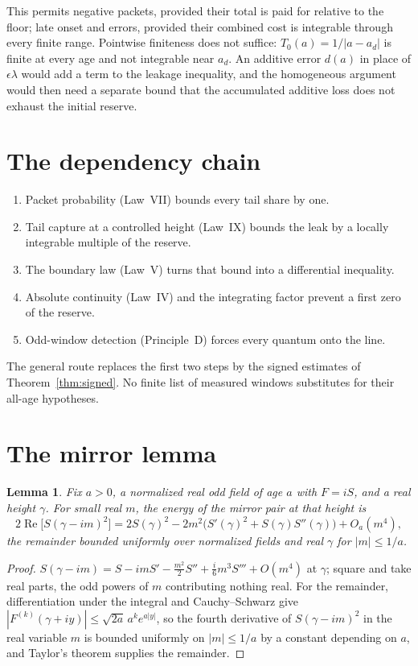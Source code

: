 \documentclass[11pt]{article}
\newtheorem{lemma}[theorem]{Lemma}
\theoremstyle{definition}
\theoremstyle{remark}
\newcommand{\Ree}{\operatorname{Re}}
\begin{document}
This permits negative packets, provided their total is paid for relative to the floor; late onset and errors, provided their combined cost is integrable through every finite range. Pointwise finiteness does not suffice: $T_0(a)=1/|a-a_d|$ is finite at every age and not integrable near $a_d$. An additive error $d(a)$ in place of $\epsilon\lambda$ would add a term to the leakage inequality, and the homogeneous argument would then need a separate bound that the accumulated additive loss does not exhaust the initial reserve.

\section{The dependency chain}

\begin{enumerate}[nosep]
\item Packet probability (Law~VII) bounds every tail share by one.
\item Tail capture at a controlled height (Law~IX) bounds the leak by a locally integrable multiple of the reserve.
\item The boundary law (Law~V) turns that bound into a differential inequality.
\item Absolute continuity (Law~IV) and the integrating factor prevent a first zero of the reserve.
\item Odd-window detection (Principle~D) forces every quantum onto the line.
\end{enumerate}
The general route replaces the first two steps by the signed estimates of Theorem~\ref{thm:signed}. No finite list of measured windows substitutes for their all-age hypotheses.

\appendix
\section{The mirror lemma}

\begin{lemma}\label{lem:mirror}
Fix $a>0$, a normalized real odd field of age $a$ with $F=iS$, and a real height $\gamma$. For small real $m$, the energy of the mirror pair at that height is
\[
2\Ree\big[S(\gamma-im)^2\big]=2S(\gamma)^2-2m^2\big(S'(\gamma)^2+S(\gamma)S''(\gamma)\big)+O_a(m^4),
\]
the remainder bounded uniformly over normalized fields and real $\gamma$ for $|m|\le1/a$.
\end{lemma}

\begin{proof}
$S(\gamma-im)=S-imS'-\tfrac{m^2}2S''+\tfrac{i}6m^3S'''+O(m^4)$ at $\gamma$; square and take real parts, the odd powers of $m$ contributing nothing real. For the remainder, differentiation under the integral and Cauchy--Schwarz give $|F^{(k)}(\gamma+iy)|\le\sqrt{2a}\,a^ke^{a|y|}$, so the fourth derivative of $S(\gamma-im)^2$ in the real variable $m$ is bounded uniformly on $|m|\le1/a$ by a constant depending on $a$, and Taylor's theorem supplies the remainder.
\end{proof}
\end{document}
